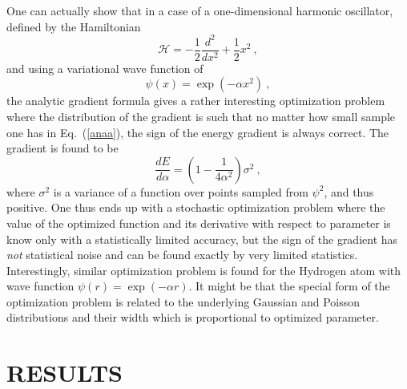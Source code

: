 \documentclass{article}
\begin{document}
One can actually show that in a case of a one-dimensional harmonic
oscillator, defined by the Hamiltonian
\begin{equation}
\mathcal{H}=-\frac 12 \frac{d^2}{dx^2} + \frac 12 x^2 \ ,
\end{equation}
and using a variational wave function of
\begin{equation}
\psi(x)=\exp{(-\alpha x^2)} \ ,
\end{equation}
the analytic gradient formula gives a rather interesting optimization
problem where the distribution of the gradient is such that no matter
how small sample one has in Eq.~(\ref{anaa}), the sign of the energy
gradient is always correct. The gradient is found to be
\begin{equation}
\frac{d E}{d \alpha} = \left(1-\frac{1}{4 \alpha^2}\right) \sigma^2 \ ,
\end{equation}
where $\sigma^2$ is a variance of a function over points sampled from
$\psi^2$, and thus positive.  One thus ends up with a stochastic
optimization problem where the value of the optimized function and its
derivative with respect to parameter is know only with a statistically
limited accuracy, but the sign of the gradient has {\sl not}
statistical noise and can be found exactly by very limited statistics.
Interestingly, similar optimization problem is found for the Hydrogen
atom with wave function $\psi(r)=\exp(-\alpha r)$. It might be that
the special form of the optimization problem is related to the
underlying Gaussian and Poisson distributions and their width which is
proportional to optimized parameter.

\section{RESULTS}
\end{document}
